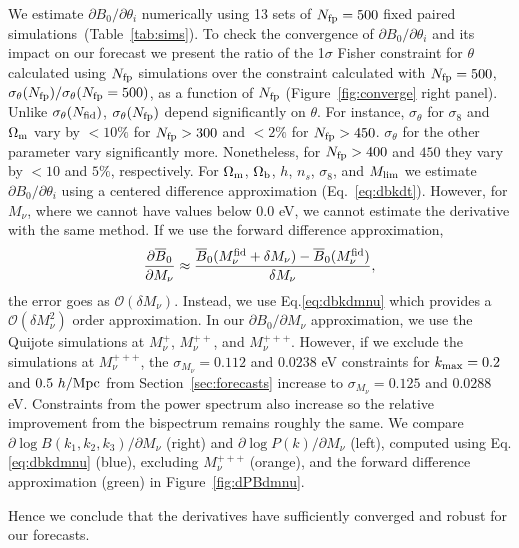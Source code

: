 \documentclass[12pt, letterpaper, preprint]{aastex62}
\newcommand{\Om}{\Omega_{\rm m}}
\newcommand{\Ob}{\Omega_{\rm b}}
\newcommand{\smnu}{M_\nu}
\newcommand{\sig}{\sigma_8}
\newcommand{\beq}{\begin{equation}}
\newcommand{\eeq}{\end{equation}}
\begin{document}
We estimate $\partial B_0/\partial \theta_i$ numerically using 13 sets of 
$N_{\rm fp} = 500$ fixed paired simulations~(Table~\ref{tab:sims}). To check 
the convergence of $\partial B_0/\partial \theta_i$ and its impact on our forecast 
we present the ratio of the 1$\sigma$ Fisher constraint for $\theta$ calculated 
using $N_{\rm fp}$ simulations over the constraint calculated with $N_{\rm fp} = 500$, 
$\sigma_\theta(N_{\rm fp})/\sigma_\theta(N_{\rm fp} = 500)$, as a function of 
$N_{\rm fp}$ (Figure~\ref{fig:converge} right panel). Unlike $\sigma_\theta(N_{\rm fid})$, 
$\sigma_\theta(N_{\rm fp})$ depend significantly on $\theta$. For instance, 
$\sigma_\theta$ for $\sig$ and $\Om$ vary by $< 10\%$ for $N_{\rm fp} > 300$ 
and $< 2\%$ for $N_{\rm fp} > 450$. $\sigma_\theta$ for the other parameter 
vary significantly more. Nonetheless, for $N_{\rm fp} > 400$ and $450$ they vary by 
$< 10$ and $5\%$, respectively. 
For $\Om$, $\Ob$, $h$, $n_s$, $\sig$, and $M_{\rm lim}$ we estimate 
$\partial B_0/\partial \theta_i$ using a centered difference approximation 
(Eq.~\ref{eq:dbkdt}). However, for $\smnu$, where we cannot have values below 
0.0 eV, we cannot estimate the derivative with the same method. If we use the 
forward difference approximation, 
\beq 
\frac{\partial \overline{B}_0}{\partial \smnu} \approx \frac{\overline{B}_0(\smnu^{\rm fid}+\delta \smnu) - \overline{B}_0(\smnu^{\rm fid})}{\delta \smnu}, 
\eeq
the error goes as $\mathcal{O}(\delta \smnu)$. Instead, we use Eq.\ref{eq:dbkdmnu} 
which provides a $\mathcal{O}(\delta \smnu^2)$ order approximation. In our 
$\partial B_0/\partial \smnu$ approximation, we use the Quijote simulations at 
$\smnu^{+}$, $\smnu^{++}$, and $\smnu^{+++}$. However, if we exclude the simulations
at $\smnu^{+++}$, the $\sigma_{\smnu} = 0.112$ and $0.0238$ eV constraints for 
$k_{\rm max} = 0.2$ and $0.5~h/{\rm Mpc}$ from Section~\ref{sec:forecasts} increase 
to $\sigma_{\smnu} = 0.125$ and $0.0288$ eV. Constraints from the power spectrum 
also increase so the relative improvement from the bispectrum remains roughly the 
same. We compare $\partial \log B(k_1, k_2, k_3)/\partial M_\nu$ (right) and 
$\partial \log P(k)/\partial M_\nu$ (left), computed using Eq.\ref{eq:dbkdmnu} (blue), 
excluding $\smnu^{+++}$ (orange), and the forward difference approximation (green) in
Figure~\ref{fig:dPBdmnu}. 



Hence we conclude that the derivatives have 
sufficiently converged and robust for our forecasts.
\end{document}
